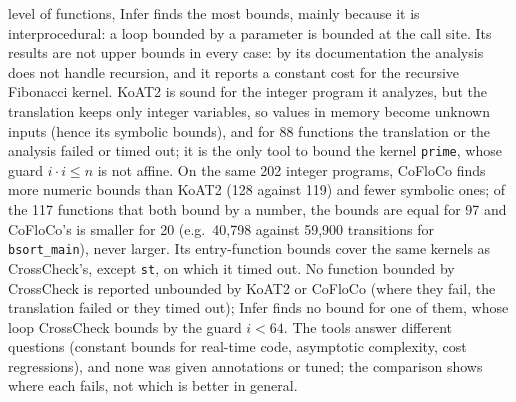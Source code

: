 \documentclass[oneside,english]{amsart}
\numberwithin{equation}{section}
\numberwithin{figure}{section}
\theoremstyle{plain}
\theoremstyle{definition}
\theoremstyle{plain}
\theoremstyle{remark}
\theoremstyle{plain}
\theoremstyle{definition}
\theoremstyle{plain}
\theoremstyle{remark}
\begin{document}
level of functions, Infer finds the most bounds, mainly because it is interprocedural: a loop bounded by a parameter is bounded at the call site. Its results are not upper bounds in every case: by its documentation \cite{infercost} the analysis does not handle recursion, and it reports a constant cost for the recursive Fibonacci kernel. KoAT2 is sound for the integer program it analyzes, but the translation keeps only integer variables, so values in memory become unknown inputs (hence its symbolic bounds), and for 88 functions the translation or the analysis failed or timed out; it is the only tool to bound the kernel \texttt{prime}, whose guard $i \cdot i \le n$ is not affine. On the same 202 integer programs, CoFloCo finds more numeric bounds than KoAT2 (128 against 119) and fewer symbolic ones; of the 117 functions that both bound by a number, the bounds are equal for 97 and CoFloCo's is smaller for 20 (e.g.\ 40{,}798 against 59{,}900 transitions for \texttt{bsort\_main}), never larger. Its entry-function bounds cover the same kernels as CrossCheck's, except \texttt{st}, on which it timed out. No function bounded by CrossCheck is reported unbounded by KoAT2 or CoFloCo (where they fail, the translation failed or they timed out); Infer finds no bound for one of them, whose loop CrossCheck bounds by the guard $i < 64$. The tools answer different questions (constant bounds for real-time code, asymptotic complexity, cost regressions), and none was given annotations or tuned; the comparison shows where each fails, not which is better in general.
\end{document}
